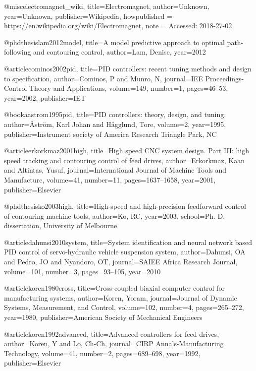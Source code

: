 @misc{electromagnet_wiki,
  title={Electromagnet},
  author={Unknown},
  year={Unknown},
  publisher={Wikipedia},
  howpublished = {\url{https://en.wikipedia.org/wiki/Electromagnet}},
  note = {Accessed: 2018-27-02}
}

@phdthesis{lam2012model,
  title={A model predictive approach to optimal path-following and contouring control},
  author={Lam, Denise},
  year={2012}
}


@article{cominos2002pid,
  title={PID controllers: recent tuning methods and design to specification},
  author={Cominos, P and Munro, N},
  journal={IEE Proceedings-Control Theory and Applications},
  volume={149},
  number={1},
  pages={46--53},
  year={2002},
  publisher={IET}
}

@book{aastrom1995pid,
  title={PID controllers: theory, design, and tuning},
  author={{\AA}str{\"o}m, Karl Johan and H{\"a}gglund, Tore},
  volume={2},
  year={1995},
  publisher={Instrument society of America Research Triangle Park, NC}
}

@article{erkorkmaz2001high,
  title={High speed CNC system design. Part III: high speed tracking and contouring control of feed drives},
  author={Erkorkmaz, Kaan and Altintas, Yusuf},
  journal={International Journal of Machine Tools and Manufacture},
  volume={41},
  number={11},
  pages={1637--1658},
  year={2001},
  publisher={Elsevier}
}

@phdthesis{ko2003high,
  title={High-speed and high-precision feedforward control of contouring machine tools},
  author={Ko, RC},
  year={2003},
  school={Ph. D. dissertation, University of Melbourne}
}

@article{dahunsi2010system,
  title={System identification and neural network based PID control of servo-hydraulic vehicle suspension system},
  author={Dahunsi, OA and Pedro, JO and Nyandoro, OT},
  journal={SAIEE Africa Research Journal},
  volume={101},
  number={3},
  pages={93--105},
  year={2010}
}

@article{koren1980cross,
  title={Cross-coupled biaxial computer control for manufacturing systems},
  author={Koren, Yoram},
  journal={Journal of Dynamic Systems, Measurement, and Control},
  volume={102},
  number={4},
  pages={265--272},
  year={1980},
  publisher={American Society of Mechanical Engineers}
}

@article{koren1992advanced,
  title={Advanced controllers for feed drives},
  author={Koren, Y and Lo, Ch-Ch},
  journal={CIRP Annals-Manufacturing Technology},
  volume={41},
  number={2},
  pages={689--698},
  year={1992},
  publisher={Elsevier}
}

